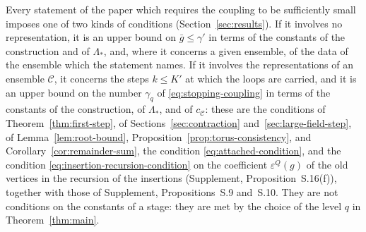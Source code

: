 \documentclass[11pt]{preprint}
\numberwithin{equation}{section}
\theoremstyle{definition}
\theoremstyle{remark}
\theoremstyle{plain}
\begin{document}
Every statement of the paper which requires the coupling to be sufficiently small imposes one of two kinds of conditions (Section~\ref{sec:results}). If it involves no representation, it is an upper bound on $\bar g \leq \gamma'$ in terms of the constants of the construction and of $\Lambda_*$, and, where it concerns a given ensemble, of the data of the ensemble which the statement names. If it involves the representations of an ensemble $\mathcal C$, it concerns the steps $k \leq K'$ at which the loops are carried, and it is an upper bound on the number $\gamma_q$ of \eqref{eq:stopping-coupling} in terms of the constants of the construction, of $\Lambda_*$, and of $c_{\mathcal C}$: these are the conditions of Theorem~\ref{thm:first-step}, of Sections~\ref{sec:contraction} and~\ref{sec:large-field-step}, of Lemma~\ref{lem:root-bound}, Proposition~\ref{prop:torus-consistency}, and Corollary~\ref{cor:remainder-sum}, the condition \eqref{eq:attached-condition}, and the condition \eqref{eq:insertion-recursion-condition} on the coefficient $\varepsilon^Q(g)$ of the old vertices in the recursion of the insertions (Supplement, Proposition~S.16(f)), together with those of Supplement, Propositions~S.9 and~S.10. They are not conditions on the constants of a stage: they are met by the choice of the level $q$ in Theorem~\ref{thm:main}.

\endappendix


\end{document}
